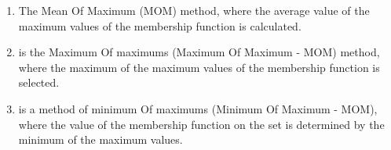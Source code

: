 \documentclass{article}
\begin{document}
\begin{minipage}{0.49\textwidth}
\begin{enumerate}
            \item The Mean Of Maximum (MOM) method, where the average value of the maximum values of the membership function is calculated.
            \item is the Maximum Of maximums (Maximum Of Maximum - MOM) method, where the maximum of the maximum values of the membership function is selected.
            \item is a method of minimum Of maximums (Minimum Of Maximum - MOM), where the value of the membership function on the set is determined by the minimum of the maximum values.
        \end{enumerate}

        ~\\
            ~\\
            ~\\
            ~\\
            ~\\
            ~\\
            ~\\
            ~\\
            ~\\
            ~\\
            ~\\
            ~\\
            ~\\
            ~\\
            ~\\
            ~\\
            ~\\
            ~\\
            ~\\
            ~\\
            ~\\
            ~\\
            ~\\
            ~\\
    \end{minipage}
    \hfill
\end{document}
